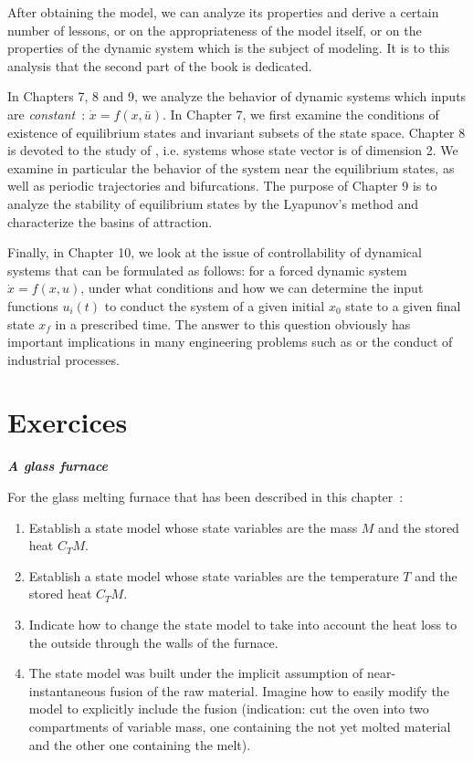 After obtaining the model, we can analyze its properties and derive a certain number of lessons, or on the appropriateness of the model itself, or on the
properties of the dynamic system which is the subject of modeling. It is to this analysis that the second part of the book is dedicated.

In Chapters 7, 8 and 9, we analyze the behavior of dynamic systems which inputs are {\it constant}~: $\dot x= f(x,\bar u)$. In Chapter 7, we first examine the conditions of existence of equilibrium states and invariant subsets of the state space. Chapter 8 is devoted to the study of , i.e. systems whose state vector is of dimension 2. We examine in particular the behavior of the system near the equilibrium states, as well as periodic trajectories and bifurcations. The purpose of Chapter 9 is to analyze the stability of equilibrium states by the Lyapunov's method and characterize the basins of attraction.

Finally, in Chapter 10, we look at the issue of controllability of dynamical systems that can be formulated as follows: for a forced dynamic system $ \dot x = f(x,u)$, under what conditions and how we can determine the input functions $u_i(t)$ to conduct the system of a given initial $x_0$ state to a given final state $x_f$ in a prescribed time. The answer to this question obviously has important implications in many engineering problems such as  or the conduct of industrial processes.
\newpage
\section{Exercices}

\begin{exercice} {\bf \em A glass furnace}

For the glass melting furnace that has been described in this chapter~:
\begin{enumerate}
\item Establish a state model whose state variables are the mass $M$ and the stored heat $C_TM$.
\item Establish a state model whose state variables are the temperature $T$ and the stored heat $C_TM$.
\item Indicate how to change the state model to take into account the heat loss to the outside through the walls of the furnace.
\item The state model was built under the implicit assumption of near-instantaneous fusion of the raw material. Imagine how to easily modify the model to explicitly include the fusion (indication: cut the oven into two compartments of variable mass, one containing the not yet molted material and the other one containing the melt).
\end{enumerate}
\end{exercice}

